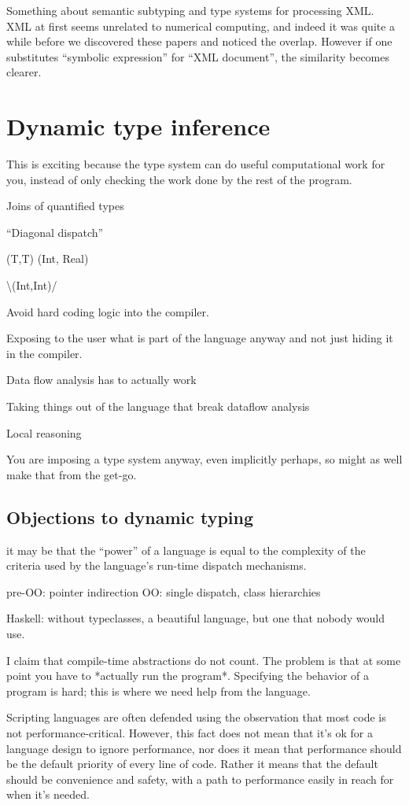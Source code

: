 Something about semantic subtyping and type systems for processing XML.
XML at first seems unrelated to numerical computing, and indeed it
was quite a while before we discovered these papers and noticed the
overlap. However if one substitutes ``symbolic expression'' for
``XML document'', the similarity becomes clearer.



\section{Dynamic type inference}

This is exciting because the type system can do useful computational work for you,
instead of only checking the work done by the rest of the program.

Joins of quantified types

``Diagonal dispatch''

(T,T) (Int, Real)

\textbackslash{}(Int,Int)/

Avoid hard coding logic into the compiler.


Exposing to the user what is part of the language anyway and not just
hiding it in the compiler.

Data flow analysis has to actually work

Taking things out of the language that break dataflow analysis

Local reasoning

You are imposing a type system anyway, even implicitly perhaps, so
might as well make that from the get-go.


\subsection{Objections to dynamic typing}


it may be that the ``power'' of a language is equal to the complexity
of the criteria used by the language's run-time dispatch mechanisms.

pre-OO: pointer indirection
OO: single dispatch, class hierarchies

Haskell: without typeclasses, a beautiful language, but one that nobody
would use.

I claim that compile-time abstractions do not count. The problem is that
at some point you have to *actually run the program*. Specifying the
behavior of a program is hard; this is where we need help from the
language.


Scripting languages are often defended using the observation that most
code is not performance-critical. However, this fact does not mean that
it's ok for a language design to ignore performance, nor does it mean
that performance should be the default priority of every line of code.
Rather it means that the default should be convenience and safety, with
a path to performance easily in reach for when it's needed.
